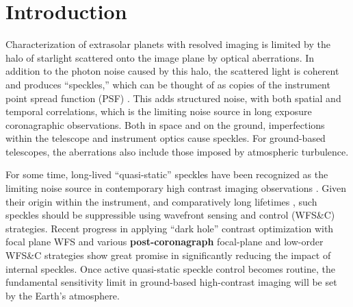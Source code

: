 \documentclass[10pt,preprint]{aastex631}
\newcommand{\mpfadd}[1]{\textcolor{avocado}{#1}}
\begin{document}
 
\section{Introduction}
Characterization of extrasolar planets with resolved imaging is limited by the halo of starlight scattered onto the image plane by optical aberrations.  In addition to the photon noise caused by this halo, the scattered light is coherent and produces ``speckles,'' which can be thought of as copies of the instrument point spread function (PSF) \citep{1995PASP..107..386M}.  This adds structured noise, with both spatial and temporal correlations, which is the limiting noise source in long exposure coronagraphic observations.    Both in space and on the ground, imperfections within the telescope and instrument optics cause speckles.   For ground-based telescopes, the aberrations also include those imposed by atmospheric turbulence.

For some time, long-lived ``quasi-static'' speckles have been recognized as the limiting noise source in contemporary high contrast imaging observations \citep[e.g.][]{2007ApJ...654..633H}.  Given their origin within the instrument, and comparatively long lifetimes \citep{2012A&A...541A.136M}, such speckles should be suppressible using wavefront sensing and control (WFS\&C) strategies.  Recent progress in applying ``dark hole'' contrast optimization with focal plane WFS \citep{2020A&A...638A.117P} and various \textbf{post-coronagraph} focal-plane \citep[e.g.][]{2010A&A...509A..31G} and low-order  WFS\&C strategies \citep[e.g.][]{2017PASP..129i5002S} show great promise in significantly reducing the impact of internal speckles.  Once active quasi-static speckle control becomes routine, the fundamental sensitivity limit in ground-based high-contrast imaging will be set by the Earth's atmosphere.

\end{document}
